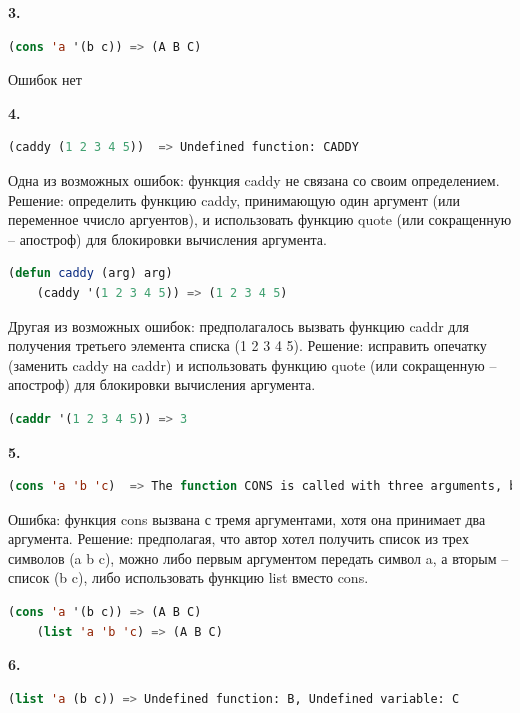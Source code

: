 \documentclass[12pt]{report}
\begin{document}
\textbf{3.} 
\begin{lstlisting}[language=Lisp]
	(cons 'a '(b c)) => (A B C)
\end{lstlisting}
Ошибок нет





\textbf{4.} 

\begin{lstlisting}[language=Lisp]
	(caddy (1 2 3 4 5))  => Undefined function: CADDY
\end{lstlisting}

Одна из возможных ошибок: функция caddy не связана со своим определением. Решение: определить функцию caddy, принимающую один аргумент  (или переменное ччисло аргуентов), и использовать функцию quote (или сокращенную -- апостроф) для блокировки вычисления аргумента.
\begin{lstlisting}[language=Lisp]
	(defun caddy (arg) arg)
	(caddy '(1 2 3 4 5)) => (1 2 3 4 5)
\end{lstlisting}

Другая из возможных ошибок: предполагалось вызвать функцию caddr для получения третьего элемента списка (1 2 3 4 5). Решение: исправить опечатку (заменить caddy на caddr) и использовать функцию quote (или сокращенную -- апостроф) для блокировки вычисления аргумента.
\begin{lstlisting}[language=Lisp]
	(caddr '(1 2 3 4 5)) => 3
\end{lstlisting}




\textbf{5.}

\begin{lstlisting}[language=Lisp]
	(cons 'a 'b 'c)  => The function CONS is called with three arguments, but wants exactly two.
\end{lstlisting}

Ошибка: функция cons вызвана с тремя аргументами, хотя она принимает два аргумента. Решение: предполагая, что автор хотел получить список из трех символов  (a b c), можно либо первым аргументом передать символ a, а вторым -- список (b c), либо использовать функцию list вместо cons.


\begin{lstlisting}[language=Lisp]
	(cons 'a '(b c)) => (A B C)
	(list 'a 'b 'c) => (A B C)
\end{lstlisting}




\textbf{6.} 
\begin{lstlisting}[language=Lisp]
	(list 'a (b c)) => Undefined function: B, Undefined variable: C
\end{lstlisting}
\end{document}
